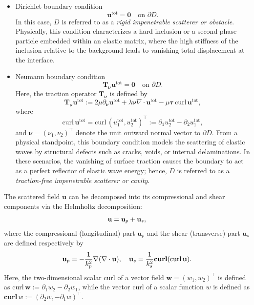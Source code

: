 \documentclass[11pt,reqno,twoside]{amsart}
\theoremstyle{definition}
\theoremstyle{remark}
\numberwithin{equation}{section}
\begin{document}
\begin{itemize}
	\item[(1)] Dirichlet boundary condition
	\begin{equation}\label{eq:DirichletBC}
		\mathbf{u}^{\mathrm{tot}} = \mathbf{0}
		\quad \text{on } \partial D.
	\end{equation}
	In this case, $D$ is referred to as a \emph{rigid impenetrable scatterer or obstacle}. Physically, this condition characterizes a hard inclusion or a second-phase particle embedded within an elastic matrix, where the high stiffness of the inclusion relative to the background leads to vanishing total displacement at the interface.
	
	\item[(2)] Neumann boundary condition
	\begin{equation}\label{eq:NeumannBC}
		\mathbf{T}_{\mathbf{\nu}} \mathbf{u}^{\mathrm{tot}} = \mathbf{0}
		\quad \text{on } \partial D.
	\end{equation}
	Here, the traction operator $\mathbf{T}_{\mathbf{\nu}}$ is defined by
	$$
	\mathbf{T}_{\mathbf{\nu}} \mathbf{u}^{\mathrm{tot}}
	:=
	2\mu \partial_{\mathbf{\nu}} \mathbf{u}^{\mathrm{tot}}
	+ \lambda \mathbf{\nu} \nabla \cdot \mathbf{u}^{\mathrm{tot}}
	- \mu \mathbf{\tau} \, \mathrm{curl}\,\mathbf{u}^{\mathrm{tot}},
	$$
	where
	$$
	\mathrm{curl}\,\mathbf{u}^{\mathrm{tot}}
	=
	\mathrm{curl}\,(u_1^{\mathrm{tot}},u_2^{\mathrm{tot}})^\top
	:=
	\partial_1 u_2^{\mathrm{tot}} - \partial_2 u_1^{\mathrm{tot}},
	$$
    and $\bm{\nu}=(\nu_1,\nu_2)^{\top}$ denote the unit outward normal vector to $\partial D$. 
	From a physical standpoint, this boundary condition models the scattering of elastic waves by structural defects such as cracks, voids, or internal delaminations. In these scenarios, the vanishing of surface traction causes the boundary to act as a perfect reflector of elastic wave energy; hence, $D$ is referred to as a \emph{traction-free impenetrable scatterer or cavity}.
\end{itemize}


The scattered field $\mathbf{u}$ can be decomposed into its compressional and shear components via the Helmholtz decomposition:
\begin{equation}\notag
    \mathbf{u} = \mathbf{u}_p + \mathbf{u}_s,
\end{equation}
where the compressional (longitudinal) part $\mathbf{u}_p$ and the shear (transverse) part $\mathbf{u}_s$ are defined respectively by
\begin{equation}\notag 
    \mathbf{u}_p = -\frac{1}{k_p^2} 
\nabla ( 
\nabla \cdot \mathbf{u} ), \quad \mathbf{u}_s = \frac{1}{k_s^2} \mathbf{curl} ( \mathrm{curl} \, \mathbf{u} ).
\end{equation}
Here, the two-dimensional scalar curl of a vector field $\mathbf{w} = (w_1, w_2)^\top$ is defined as $\mathrm{curl} \, \mathbf{w} := \partial_1 w_2 - \partial_2 w_1$, while the vector curl of a scalar function $w$ is defined as $\mathbf{curl} \, w := (\partial_2 w, -\partial_1 w)^\top$.
\end{document}
